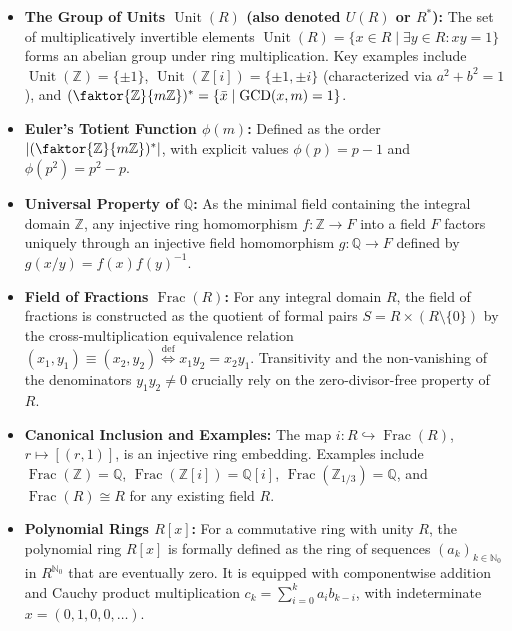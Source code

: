 \begin{overview}
\begin{itemize}
    \item \textbf{The Group of Units $\operatorname{Unit}(R)$ (also denoted $U(R)$ or $R^*$):} The set of multiplicatively invertible elements $\operatorname{Unit}(R) = \{x \in R \mid \exists y \in R \colon xy = 1\}$ forms an abelian group under ring multiplication. Key examples include $\operatorname{Unit}(\mathbb{Z}) = \{\pm 1\}$, $\operatorname{Unit}(\mathbb{Z}[i]) = \{\pm 1, \pm i\}$ (characterized via $a^2 + b^2 = 1$), and $(\faktor{\mathbb{Z}}{m\mathbb{Z}})^* = \{\bar{x} \mid \operatorname{GCD}(x, m) = 1\}$.
    \item \textbf{Euler's Totient Function $\phi(m)$:} Defined as the order $|(\faktor{\mathbb{Z}}{m\mathbb{Z}})^*|$, with explicit values $\phi(p) = p - 1$ and $\phi(p^2) = p^2 - p$.
    \item \textbf{Universal Property of $\mathbb{Q}$:} As the minimal field containing the integral domain $\mathbb{Z}$, any injective ring homomorphism $f \colon \mathbb{Z} \to F$ into a field $F$ factors uniquely through an injective field homomorphism $g \colon \mathbb{Q} \to F$ defined by $g(x/y) = f(x)f(y)^{-1}$.
    \item \textbf{Field of Fractions $\operatorname{Frac}(R)$:} For any integral domain $R$, the field of fractions is constructed as the quotient of formal pairs $S = R \times (R \setminus \{0\})$ by the cross-multiplication equivalence relation $(x_1, y_1) \equiv (x_2, y_2) \stackrel{\text{def}}{\iff} x_1 y_2 = x_2 y_1$. Transitivity and the non-vanishing of the denominators $y_1 y_2 \neq 0$ crucially rely on the zero-divisor-free property of $R$.
    \item \textbf{Canonical Inclusion and Examples:} The map $i \colon R \hookrightarrow \operatorname{Frac}(R)$, $r \mapsto [(r, 1)]$, is an injective ring embedding. Examples include $\operatorname{Frac}(\mathbb{Z}) = \mathbb{Q}$, $\operatorname{Frac}(\mathbb{Z}[i]) = \mathbb{Q}[i]$, $\operatorname{Frac}(\mathbb{Z}_{1/3}) = \mathbb{Q}$, and $\operatorname{Frac}(R) \cong R$ for any existing field $R$.
    \item \textbf{Polynomial Rings $R[x]$:} For a commutative ring with unity $R$, the polynomial ring $R[x]$ is formally defined as the ring of sequences $(a_k)_{k \in \mathbb{N}_0}$ in $R^{\mathbb{N}_0}$ that are eventually zero. It is equipped with componentwise addition and Cauchy product multiplication $c_k = \sum_{i=0}^k a_i b_{k-i}$, with indeterminate $x = (0, 1, 0, 0, \dots)$.
\end{itemize}
\end{overview}
